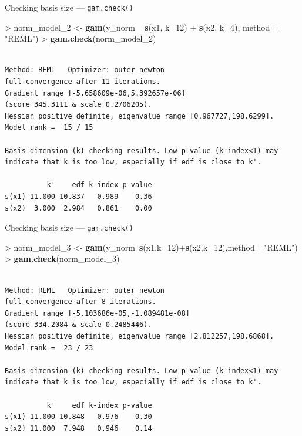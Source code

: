 \documentclass[10pt,ignorenonframetext,compress, aspectratio=169]{beamer}
\newenvironment{Shaded}{\begin{snugshade}}{\end{snugshade}}
\newcommand{\KeywordTok}[1]{\textcolor[rgb]{0.13,0.29,0.53}{\textbf{{#1}}}}
\newcommand{\DataTypeTok}[1]{\textcolor[rgb]{0.13,0.29,0.53}{{#1}}}
\newcommand{\DecValTok}[1]{\textcolor[rgb]{0.00,0.00,0.81}{{#1}}}
\newcommand{\StringTok}[1]{\textcolor[rgb]{0.31,0.60,0.02}{{#1}}}
\newcommand{\NormalTok}[1]{{#1}}
\begin{document}
\begin{frame}[fragile]{Checking basis size --- \texttt{gam.check()}}

\begin{Shaded}
\begin{Highlighting}[]
\NormalTok{>}\StringTok{ }\NormalTok{norm_model_2 <-}\StringTok{ }\KeywordTok{gam}\NormalTok{(y_norm ~}\StringTok{ }\KeywordTok{s}\NormalTok{(x1, }\DataTypeTok{k=}\DecValTok{12}\NormalTok{) +}\StringTok{ }\KeywordTok{s}\NormalTok{(x2, }\DataTypeTok{k=}\DecValTok{4}\NormalTok{), }\DataTypeTok{method =} \StringTok{"REML"}\NormalTok{)}
\NormalTok{>}\StringTok{ }\KeywordTok{gam.check}\NormalTok{(norm_model_2)}
\end{Highlighting}
\end{Shaded}

\begin{verbatim}

Method: REML   Optimizer: outer newton
full convergence after 11 iterations.
Gradient range [-5.658609e-06,5.392657e-06]
(score 345.3111 & scale 0.2706205).
Hessian positive definite, eigenvalue range [0.967727,198.6299].
Model rank =  15 / 15 

Basis dimension (k) checking results. Low p-value (k-index<1) may
indicate that k is too low, especially if edf is close to k'.

          k'    edf k-index p-value
s(x1) 11.000 10.837   0.989    0.36
s(x2)  3.000  2.984   0.861    0.00
\end{verbatim}

\end{frame}

\begin{frame}[fragile]{Checking basis size --- \texttt{gam.check()}}

\begin{Shaded}
\begin{Highlighting}[]
\NormalTok{>}\StringTok{ }\NormalTok{norm_model_3 <-}\StringTok{ }\KeywordTok{gam}\NormalTok{(y_norm~}\KeywordTok{s}\NormalTok{(x1,}\DataTypeTok{k=}\DecValTok{12}\NormalTok{)+}\KeywordTok{s}\NormalTok{(x2,}\DataTypeTok{k=}\DecValTok{12}\NormalTok{),}\DataTypeTok{method=} \StringTok{"REML"}\NormalTok{)}
\NormalTok{>}\StringTok{ }\KeywordTok{gam.check}\NormalTok{(norm_model_3)}
\end{Highlighting}
\end{Shaded}

\begin{verbatim}

Method: REML   Optimizer: outer newton
full convergence after 8 iterations.
Gradient range [-5.103686e-05,-1.089481e-08]
(score 334.2084 & scale 0.2485446).
Hessian positive definite, eigenvalue range [2.812257,198.6868].
Model rank =  23 / 23 

Basis dimension (k) checking results. Low p-value (k-index<1) may
indicate that k is too low, especially if edf is close to k'.

          k'    edf k-index p-value
s(x1) 11.000 10.848   0.976    0.30
s(x2) 11.000  7.948   0.946    0.14
\end{verbatim}

\end{frame}
\end{document}
